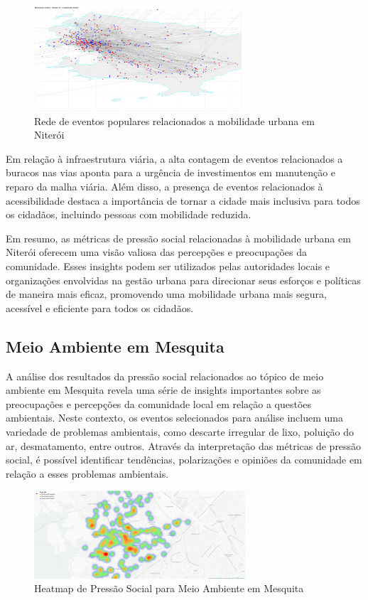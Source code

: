 \begin{figure}[htb]
	\centering
	\includegraphics[width=0.7\textwidth]{images/network_niteroi_personas_map.png}
	\caption{Rede de eventos populares relacionados a mobilidade urbana em Niterói}
	\label{fig:network_niteroi_personas_map}
\end{figure}

Em relação à infraestrutura viária, a alta contagem de eventos relacionados a buracos nas vias aponta para a urgência de investimentos em manutenção e reparo da malha viária. Além disso, a presença de eventos relacionados à acessibilidade destaca a importância de tornar a cidade mais inclusiva para todos os cidadãos, incluindo pessoas com mobilidade reduzida.

Em resumo, as métricas de pressão social relacionadas à mobilidade urbana em Niterói oferecem uma visão valiosa das percepções e preocupações da comunidade. Esses insights podem ser utilizados pelas autoridades locais e organizações envolvidas na gestão urbana para direcionar seus esforços e políticas de maneira mais eficaz, promovendo uma mobilidade urbana mais segura, acessível e eficiente para todos os cidadãos.

\subsection{Meio Ambiente em Mesquita}
A análise dos resultados da pressão social relacionados ao tópico de meio ambiente em Mesquita revela uma série de insights importantes sobre as preocupações e percepções da comunidade local em relação a questões ambientais. Neste contexto, os eventos selecionados para análise incluem uma variedade de problemas ambientais, como descarte irregular de lixo, poluição do ar, desmatamento, entre outros. Através da interpretação das métricas de pressão social, é possível identificar tendências, polarizações e opiniões da comunidade em relação a esses problemas ambientais.

\begin{figure}[htb]
	\centering
	\includegraphics[width=0.7\textwidth]{images/heatmap_mesquita.PNG}
	\caption{Heatmap de Pressão Social para Meio Ambiente em Mesquita}
	\label{fig:heatmap_mesquita}
\end{figure}

